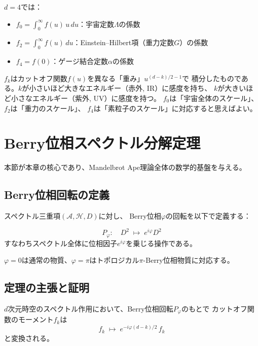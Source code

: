 $d=4$では：
\begin{itemize}
\item $f_0 = \int_0^\infty f(u)\, u\, du$：宇宙定数$\Lambda$の係数
\item $f_2 = \int_0^\infty f(u)\, du$：Einstein--Hilbert項（重力定数$G$）の係数
\item $f_4 = f(0)$：ゲージ結合定数$\alpha$の係数
\end{itemize}

\begin{hsbox}
$f_k$はカットオフ関数$f(u)$を異なる「重み」$u^{(d-k)/2-1}$で
積分したものである。$k$が小さいほど大きなエネルギー（赤外, IR）に感度を持ち、
$k$が大きいほど小さなエネルギー（紫外, UV）に感度を持つ。
$f_0$は「宇宙全体のスケール」、
$f_2$は「重力のスケール」、
$f_4$は「素粒子のスケール」に対応すると思えばよい。
\end{hsbox}


\section{Berry位相スペクトル分解定理}
\label{sec:7.3}

本節が本章の核心であり、Mandelbrot Ape理論全体の数学的基盤を与える。

\subsection{Berry位相回転の定義}

スペクトル三重項$(\mathcal{A}, \mathcal{H}, D)$に対し、
Berry位相$\varphi$の回転を以下で定義する：

\begin{dfnbox}
\begin{equation}
P_\varphi:\quad D^2 \;\longmapsto\; e^{i\varphi} D^2
\end{equation}
すなわちスペクトル全体に位相因子$e^{i\varphi}$を乗じる操作である。
\end{dfnbox}

\noindent
$\varphi = 0$は通常の物質、$\varphi = \pi$はトポロジカル$\pi$-Berry位相物質に対応する。

\subsection{定理の主張と証明}

\begin{keyresult}[Berry位相スペクトル分解定理]
\begin{theorem}[Berry位相スペクトル分解]
\label{thm:berry-spectral}
$d$次元時空のスペクトル作用において、Berry位相回転$P_\varphi$のもとで
カットオフ関数のモーメント$f_k$は
\begin{equation}
\boxed{f_k \;\longmapsto\; e^{-i\varphi(d-k)/2}\, f_k}
\end{equation}
と変換される。
\end{theorem}
\end{keyresult}

